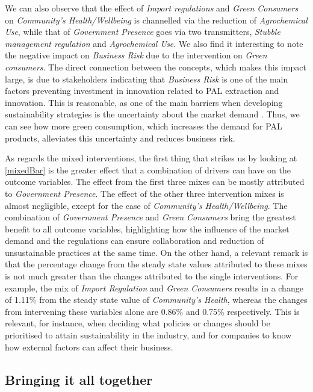 We can also observe that the effect of \textit{Import regulations} and \textit{Green Consumers} on \textit{Community's Health/Wellbeing} is channelled via the reduction of \textit{Agrochemical Use}, while that of \textit{Government Presence} goes via two transmitters, \textit{Stubble management regulation} and \textit{Agrochemical Use}. We also find it interesting to note the negative impact on \textit{Business Risk} due to the intervention on \textit{Green consumers}. The direct connection between the concepts, which makes this impact large, is due to stakeholders indicating that \textit{Business Risk} is one of the main factors preventing investment in innovation related to PAL extraction and innovation. This is reasonable, as one of the main barriers when developing sustainability strategies is the uncertainty about the market demand \citep{chkanikova2015corporate}. Thus, we can see how more green consumption, which increases the demand for PAL products, alleviates this uncertainty and reduces business risk. 

As regards the mixed interventions, the first thing that strikes us by looking at \cref{mixedBar} is the greater effect that a combination of drivers can have on the outcome variables. The effect from the first three mixes can be mostly attributed to \textit{Government Presence}. The effect of the other three intervention mixes is almost negligible, except for the case of \textit{Community's Health/Wellbeing}. The combination of \textit{Government Presence} and \textit{Green Consumers} bring the greatest benefit to all outcome variables, highlighting how the influence of the market demand and the regulations can ensure collaboration and reduction of unsustainable practices at the same time. On the other hand, a relevant remark is that the percentage change from the steady state values attributed to these mixes is not much greater than the changes attributed to the single interventions. For example, the mix of \textit{Import Regulation} and \textit{Green Consumers} results in a change of 1.11\% from the steady state value of \textit{Community's Health}, whereas the changes from intervening these variables alone are 0.86\% and 0.75\% respectively. This is relevant, for instance, when deciding what policies or changes should be prioritised to attain sustainability in the industry, and for companies to know how external factors can affect their business. 


\subsection{Bringing it all together}

